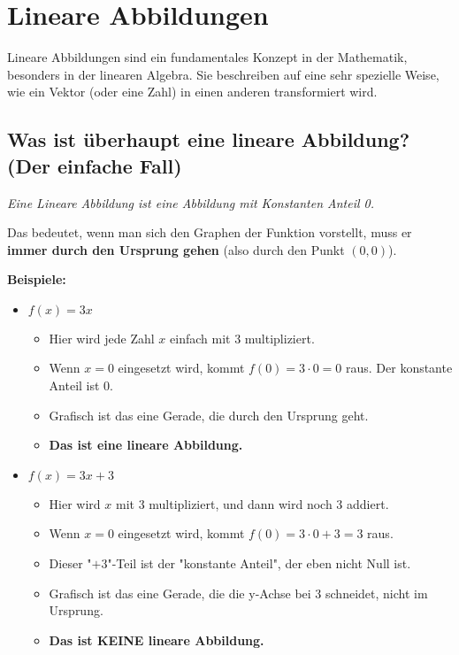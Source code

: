 \chapter{Lineare Abbildungen}

Lineare Abbildungen sind ein fundamentales Konzept in der Mathematik, besonders in der linearen Algebra. Sie beschreiben auf eine sehr spezielle Weise, wie ein Vektor (oder eine Zahl) in einen anderen transformiert wird.

\section{Was ist überhaupt eine lineare Abbildung? (Der einfache Fall)}

\textit{Eine Lineare Abbildung ist eine Abbildung mit Konstanten Anteil 0.}

Das bedeutet, wenn man sich den Graphen der Funktion vorstellt, muss er \textbf{immer durch den Ursprung gehen} (also durch den Punkt $(0,0)$).

\textbf{Beispiele:}
\begin{itemize}
    \item $f(x) = 3x$
    \begin{itemize}
        \item Hier wird jede Zahl $x$ einfach mit 3 multipliziert.
        \item Wenn $x=0$ eingesetzt wird, kommt $f(0) = 3 \cdot 0 = 0$ raus. Der konstante Anteil ist 0.
        \item Grafisch ist das eine Gerade, die durch den Ursprung geht.
        \item \textbf{Das ist eine lineare Abbildung.}
    \end{itemize}

    \item $f(x) = 3x + 3$
    \begin{itemize}
        \item Hier wird $x$ mit 3 multipliziert, und dann wird noch 3 addiert.
        \item Wenn $x=0$ eingesetzt wird, kommt $f(0) = 3 \cdot 0 + 3 = 3$ raus.
        \item Dieser "$+3$"-Teil ist der "konstante Anteil", der eben nicht Null ist.
        \item Grafisch ist das eine Gerade, die die y-Achse bei 3 schneidet, nicht im Ursprung.
        \item \textbf{Das ist KEINE lineare Abbildung.}
    \end{itemize}
\end{itemize}

